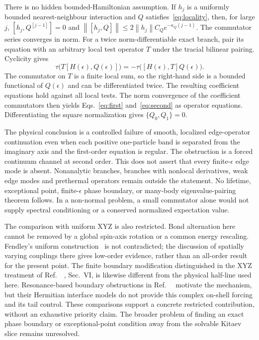 \documentclass[11pt,a4paper]{article}
\newcommand{\norm}[1]{\left\lVert#1\right\rVert}
\begin{document}
There is no hidden bounded-Hamiltonian assumption. If $h_j$ is a uniformly
bounded nearest-neighbour interaction and $Q$ satisfies~\eqref{eq:locality},
then, for large $j$, $[h_j,Q^{[j-1]}]=0$ and
$\norm{[h_j,Q]}\leq2\norm{h_j}C_Qe^{-\kappa_Q(j-1)}$.
The commutator series converges in norm. For a twice norm-differentiable
exact branch, pair its equation with an arbitrary local test operator
$T$ under the tracial bilinear pairing. Cyclicity gives
\begin{equation}
 \tau\bigl(T[H(\epsilon),Q(\epsilon)]\bigr)
       =-\tau\bigl([H(\epsilon),T]Q(\epsilon)\bigr).\label{eq:domain}
\end{equation}
The commutator on $T$ is a finite local sum, so the right-hand side is a
bounded functional of $Q(\epsilon)$ and can be differentiated twice.
The resulting coefficient equations hold against all local tests.
The norm convergence of the coefficient commutators then yields
Eqs.~\eqref{eq:first} and~\eqref{eq:second} as operator equations.
Differentiating the square normalization gives $\{Q_0,Q_1\}=0$.

The physical conclusion is a controlled failure of smooth, localized
edge-operator continuation even when each positive one-particle band is
separated from the imaginary axis and the first-order equation is regular.
The obstruction is a forced continuum channel at second order. This does
not assert that every finite-$\epsilon$ edge mode is absent. Nonanalytic
branches, branches with nonlocal derivatives, weak edge modes and
prethermal operators remain outside the statement. No lifetime, exceptional
point, finite-$\epsilon$ phase boundary, or many-body eigenvalue-pairing
theorem follows. In a non-normal problem, a small commutator alone would
not supply spectral conditioning or a conserved normalized expectation
value.

The comparison with uniform XYZ is also restricted. Bond alternation here
cannot be removed by a global spin-axis rotation or a common energy
rescaling. Fendley's uniform construction~\cite{Fendley2016} is not
contradicted; the discussion of spatially varying couplings there gives
low-order evidence, rather than an all-order result for the present point.
The finite boundary modification distinguished in the XYZ treatment of
Ref.~~\cite{Moudgalya2026}, Sec.~VI, is likewise different from the physical
half-line used here. Resonance-based boundary obstructions in
Ref.~~\cite{Olund2025} motivate the mechanism, but their Hermitian interface
models do not provide this complex on-shell forcing and its tail control.
These comparisons support a concrete restricted contribution, without an
exhaustive priority claim. The broader problem of finding an exact phase
boundary or exceptional-point condition away from the solvable Kitaev
slice remains unresolved.
\end{document}
